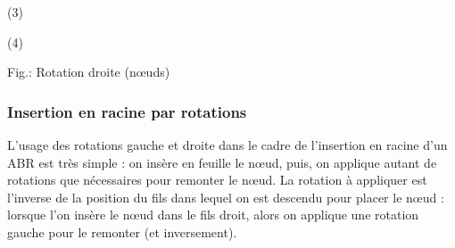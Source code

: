 \documentclass[11pt,a4paper]{article}
\begin{document}
\begin{table}[ht!]
\begin{minipage}{0.25\textwidth}

(3)

  \end{minipage}
  \hfillx
  \begin{minipage}{0.25\textwidth}
    \centering


(4)

  \end{minipage}
\caption{Fig.\thefigure : Rotation droite (nœuds)}
\label{fig:example4-BST-rotation-right-nodes}
\end{table}


\medskip


\subsubsection{Insertion en racine par rotations}

L'usage des rotations gauche et droite dans le cadre de l'insertion en racine d'un ABR est très simple : on insère en feuille le nœud, puis, on applique autant de rotations que nécessaires pour remonter le nœud.
La rotation à appliquer est l'inverse de la position du fils dans lequel on est descendu pour placer le nœud : lorsque l'on insère le nœud dans le fils droit, alors on applique une rotation gauche pour le remonter (et inversement).
\end{document}

